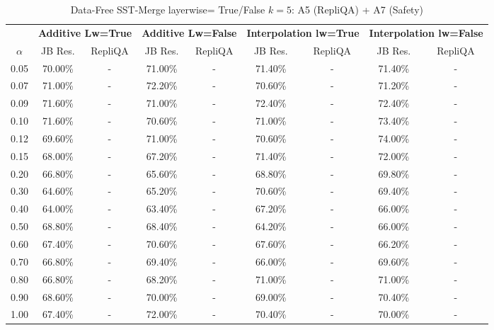 \begin{table}[h]
\centering
\caption{Data-Free SST-Merge layerwise= True/False $k=5$: A5 (RepliQA) + A7 (Safety)}
\label{tab:res_a5_a7_data_free_sst_5}
\begin{tabular}{c|cc|cc|cc|cc}
\hline
 & \multicolumn{2}{c|}{\textbf{Additive Lw=True}} & \multicolumn{2}{c|}{\textbf{Additive Lw=False}} & \multicolumn{2}{c|}{\textbf{Interpolation lw=True}}& \multicolumn{2}{c}{\textbf{Interpolation lw=False}} \\
$\alpha$ & JB Res. & RepliQA & JB Res. & RepliQA & JB Res. & RepliQA & JB Res. & RepliQA \\
\hline
0.05 & 70.00\% & - & 71.00\% & - & 71.40\% & - & 71.40\% & - \\
0.07 & 71.00\% & - & 72.20\% & - & 70.60\% & - & 71.20\% & - \\
0.09 & 71.60\% & - & 71.00\% & - & 72.40\% & - & 72.40\% & - \\
0.10 & 71.60\% & - & 70.60\% & - & 71.00\% & - & 73.40\% & - \\
0.12 & 69.60\% & - & 71.00\% & - & 70.60\% & - & 74.00\% & - \\
0.15 & 68.00\% & - & 67.20\% & - & 71.40\% & - & 72.00\% & - \\
0.20 & 66.80\% & - & 65.60\% & - & 68.80\% & - & 69.80\% & - \\
0.30 & 64.60\% & - & 65.20\% & - & 70.60\% & - & 69.40\% & - \\
0.40 & 64.00\% & - & 63.40\% & - & 67.20\% & - & 66.00\% & - \\
0.50 & 68.80\% & - & 68.40\% & - & 64.20\% & - & 66.00\% & - \\
0.60 & 67.40\% & - & 70.60\% & - & 67.60\% & - & 66.20\% & - \\
0.70 & 66.80\% & - & 69.40\% & - & 66.00\% & - & 69.60\% & - \\
0.80 & 66.80\% & - & 68.20\% & - & 71.00\% & - & 71.00\% & - \\
0.90 & 68.60\% & - & 70.00\% & - & 69.00\% & - & 70.40\% & - \\
1.00 & 67.40\% & - & 72.00\% & - & 70.40\% & - & 70.00\% & - \\
\hline
\end{tabular}
\end{table}
\FloatBarrier


